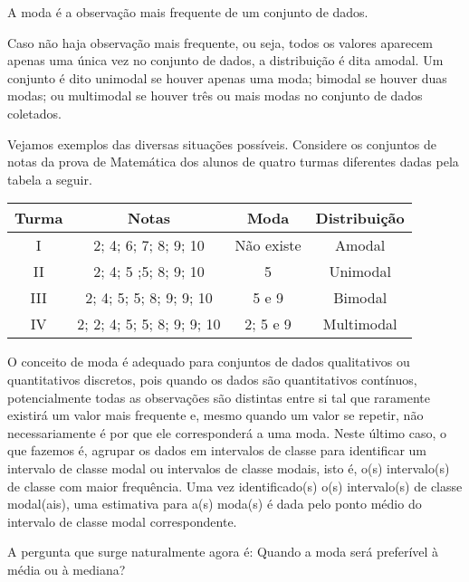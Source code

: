 A moda é a observação mais frequente de um conjunto de dados.

Caso não haja observação mais frequente, ou seja, todos os valores aparecem apenas uma única vez no conjunto de dados, a distribuição é dita amodal. Um conjunto é dito unimodal se houver apenas uma moda; bimodal se houver duas modas; ou multimodal se houver três ou mais modas no conjunto de dados coletados.

Vejamos exemplos das diversas situações possíveis. Considere os conjuntos de notas da prova de Matemática dos alunos de quatro turmas diferentes dadas pela tabela a seguir.


\begin{savenotes}\sphinxattablestart
\centering
{}
\label{\detokenize{PE104-1:id17}}
\sphinxaftercaption
\begin{tabulary}{\linewidth}[t]{|c|c|c|c|}
\hline

Turma
&
Notas
&
Moda
&
Distribuição
\\
\hline
I
&
2; 4; 6; 7; 8; 9; 10
&
Não existe
&
Amodal
\\
\hline
II
&
2; 4; 5 ;5; 8; 9; 10
&
5
&
Unimodal
\\
\hline
III
&
2; 4; 5; 5; 8; 9; 9; 10
&
5 e 9
&
Bimodal
\\
\hline
IV
&
2; 2; 4; 5; 5; 8; 9; 9; 10
&
2; 5 e 9
&
Multimodal
\\
\hline
\end{tabulary}
\par
\sphinxattableend\end{savenotes}

O conceito de moda é adequado para conjuntos de dados qualitativos ou quantitativos discretos, pois quando os dados são quantitativos contínuos, potencialmente todas as observações são distintas entre si tal que raramente existirá um valor mais frequente e, mesmo quando um valor se repetir, não necessariamente é por que ele corresponderá a uma moda. Neste último caso, o que fazemos é, agrupar os dados em intervalos de classe para identificar um intervalo de classe modal ou intervalos de classe modais, isto é, o(s) intervalo(s) de classe com maior frequência. Uma vez identificado(s) o(s) intervalo(s) de classe modal(ais), uma estimativa para a(s) moda(s) é dada pelo ponto médio do intervalo de classe modal correspondente.

A pergunta que surge naturalmente agora é: Quando a moda será preferível à média ou à mediana?

